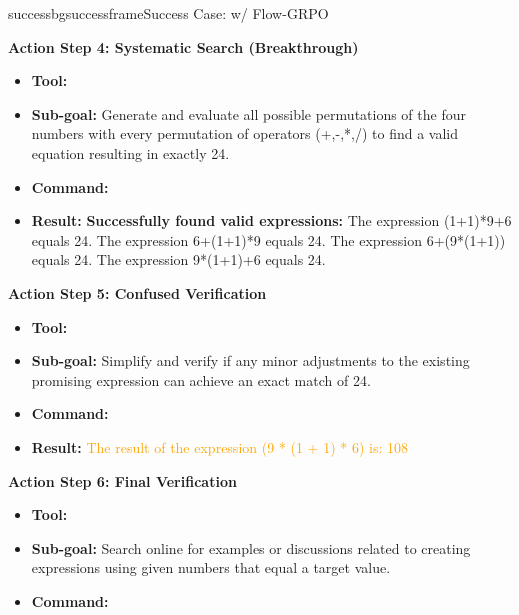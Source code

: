 \begin{small}
\begin{center}
\begin{casebox}{successbg}{successframe}{Success Case: \model w/ Flow-GRPO}
    \vspace{1em}

    \textbf{Action Step 4: Systematic Search (Breakthrough)}
    \begin{itemize}[nosep, leftmargin=*]
        \item \textbf{Tool:} 
        \item \textbf{Sub-goal:} Generate and evaluate all possible permutations of the four numbers with every permutation of operators (+,-,*,/) to find a valid equation resulting in exactly 24.
        \item \textbf{Command:} 
        
        \item \textbf{Result:} \textbf{Successfully found valid expressions:} The expression (1+1)*9+6 equals 24. The expression 6+(1+1)*9 equals 24. The expression 6+(9*(1+1)) equals 24. The expression 9*(1+1)+6 equals 24.
    \end{itemize}

    \vspace{1em}

    \textbf{Action Step 5: Confused Verification}
    \begin{itemize}[nosep, leftmargin=*]
        \item \textbf{Tool:} 
        \item \textbf{Sub-goal:} Simplify and verify if any minor adjustments to the existing promising expression can achieve an exact match of 24.
        \item \textbf{Command:} 
        
        \item \textbf{Result:} \textcolor{orange}{The result of the expression (9 * (1 + 1) * 6) is: 108}
    \end{itemize}

    \vspace{1em}

    \textbf{Action Step 6: Final Verification}
    \begin{itemize}[nosep, leftmargin=*]
        \item \textbf{Tool:} 
        \item \textbf{Sub-goal:} Search online for examples or discussions related to creating expressions using given numbers that equal a target value.
        \item \textbf{Command:} 
        

\end{itemize}
\end{casebox}
\end{center}
\end{small}
